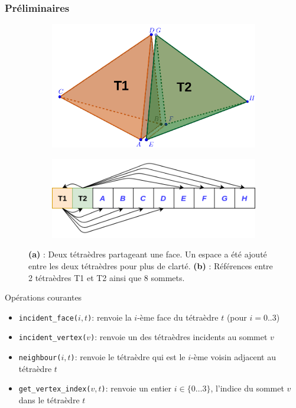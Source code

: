 \documentclass[9pt]{beamer}
\begin{document}
\begin{frame}
\footnotesize
\frametitle{Préliminaires}
\begin{figure}[H]
\centering
\begin{subfigure}{.5\textwidth}
  \centering
  \includegraphics[scale=0.085]{Images/lala}
  \caption{}
\end{subfigure}%
\begin{subfigure}{.5\textwidth}
  \centering
  \includegraphics[scale=0.15]{Images/Untitled_Diagram}
  \caption{}
\end{subfigure}
\caption{\textbf{(a)} : Deux tétraèdres partageant une face. Un espace a été ajouté entre les deux tétraèdres pour plus de clarté. \textbf{(b)} : Références entre 2 tétraèdres T1 et T2 ainsi que 8 sommets.}
\end{figure}
\begin{block}{Opérations courantes}
\begin{itemize}
\item \texttt{incident\_face($i,t$)}: renvoie la $i$-ème face du tétraèdre $t$ (pour $i=0..3$)
\item \texttt{incident\_vertex($v$)}: renvoie un des tétraèdres incidents au sommet $v$
\item \texttt{neighbour($i, t$)}: renvoie le tétraèdre qui est le $i$-ème voisin adjacent au tétraèdre $t$
\item \texttt{get\_vertex\_index($v,t$)}: renvoie un entier $i\in\{0 \ldots 3 \}$, l'indice du sommet $v$ dans le tétraèdre $t$
\end{itemize}
\end{block}


\end{frame}
\end{document}
